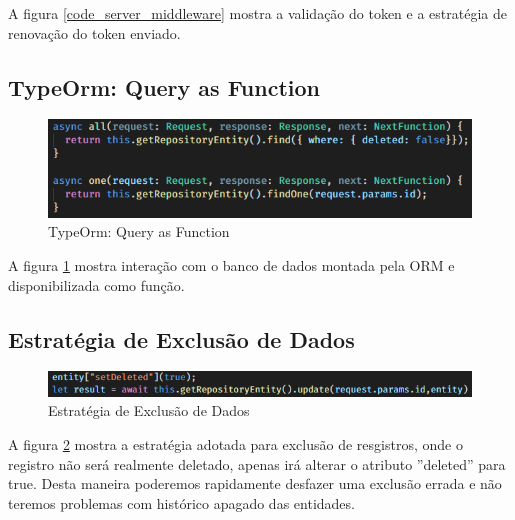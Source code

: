 A figura \ref{code_server_middleware} mostra a validação do token e a estratégia de renovação do token enviado.

\newpage
\subsection{TypeOrm: Query as Function}

\begin{figure}[htb]
	\caption{\label{code_server_typeorm-query-as-function}TypeOrm: Query as Function}
	\begin{center}
		\includegraphics[scale=1.00]{./Figuras/code/server/typeorm-query-as-function.png}
	\end{center}
\end{figure}

A figura \ref{code_server_typeorm-query-as-function} mostra interação com o banco de dados montada pela ORM e disponibilizada como função.

\subsection{Estratégia de Exclusão de Dados}

\begin{figure}[htb]
	\caption{\label{code_server_delete-strategy}Estratégia de Exclusão de Dados}
	\begin{center}
		\includegraphics[scale=0.90]{./Figuras/code/server/delete-strategy.png}
	\end{center}
\end{figure}

A figura \ref{code_server_delete-strategy} mostra a estratégia adotada para exclusão de resgistros, onde o registro não será realmente deletado, apenas irá alterar o atributo ''deleted'' para true. Desta maneira poderemos rapidamente desfazer uma exclusão errada e não teremos problemas com histórico apagado das entidades.
